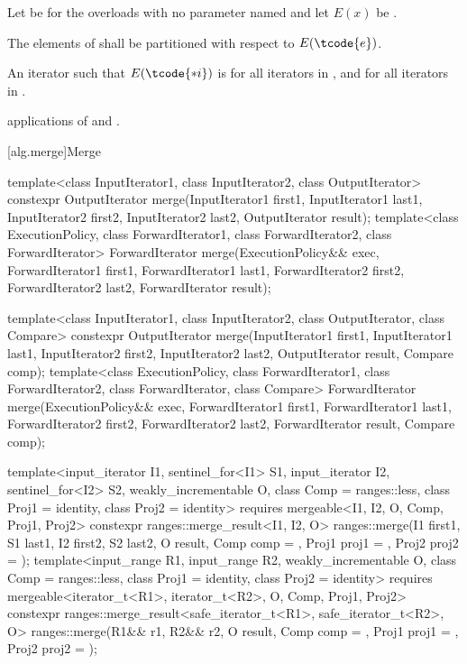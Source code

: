 \begin{itemdescr}
\pnum
Let  be 
for the overloads with no parameter named 
and let $E(x)$ be .

\pnum
\requires
The elements  of 
shall be partitioned with respect to $E(\tcode{e})$.

\pnum
\returns
An iterator 
such that $E(\tcode{*i})$ is 
for all iterators  in , and
 for all iterators  in .

\pnum
\complexity
{} applications
of  and .
\end{itemdescr}

[alg.merge]{Merge}

%
\begin{itemdecl}
template<class InputIterator1, class InputIterator2,
         class OutputIterator>
  constexpr OutputIterator
    merge(InputIterator1 first1, InputIterator1 last1,
          InputIterator2 first2, InputIterator2 last2,
          OutputIterator result);
template<class ExecutionPolicy, class ForwardIterator1, class ForwardIterator2,
         class ForwardIterator>
  ForwardIterator
    merge(ExecutionPolicy&& exec,
          ForwardIterator1 first1, ForwardIterator1 last1,
          ForwardIterator2 first2, ForwardIterator2 last2,
          ForwardIterator result);

template<class InputIterator1, class InputIterator2,
         class OutputIterator, class Compare>
  constexpr OutputIterator
    merge(InputIterator1 first1, InputIterator1 last1,
          InputIterator2 first2, InputIterator2 last2,
          OutputIterator result, Compare comp);
template<class ExecutionPolicy, class ForwardIterator1, class ForwardIterator2,
         class ForwardIterator, class Compare>
  ForwardIterator
    merge(ExecutionPolicy&& exec,
          ForwardIterator1 first1, ForwardIterator1 last1,
          ForwardIterator2 first2, ForwardIterator2 last2,
          ForwardIterator result, Compare comp);

template<input_iterator I1, sentinel_for<I1> S1, input_iterator I2, sentinel_for<I2> S2,
         weakly_incrementable O, class Comp = ranges::less, class Proj1 = identity,
         class Proj2 = identity>
  requires mergeable<I1, I2, O, Comp, Proj1, Proj2>
  constexpr ranges::merge_result<I1, I2, O>
    ranges::merge(I1 first1, S1 last1, I2 first2, S2 last2, O result,
                  Comp comp = {}, Proj1 proj1 = {}, Proj2 proj2 = {});
template<input_range R1, input_range R2, weakly_incrementable O, class Comp = ranges::less,
         class Proj1 = identity, class Proj2 = identity>
  requires mergeable<iterator_t<R1>, iterator_t<R2>, O, Comp, Proj1, Proj2>
  constexpr ranges::merge_result<safe_iterator_t<R1>, safe_iterator_t<R2>, O>
    ranges::merge(R1&& r1, R2&& r2, O result,
                  Comp comp = {}, Proj1 proj1 = {}, Proj2 proj2 = {});
\end{itemdecl}

